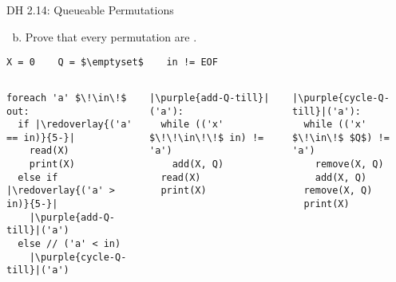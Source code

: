 \begin{frame}[fragile]{}
  \begin{exampleblock}{DH 2.14: Queueable Permutations}
    \begin{enumerate}[(a)]
      \setcounter{enumi}{1}
      \item Prove that every permutation are .
    \end{enumerate}
  \end{exampleblock}

  \pause
  \begin{lstlisting}[style = Cstyle]
              X = 0    Q = $\emptyset$    in != EOF
  \end{lstlisting}

  \begin{columns}
      \begin{lstlisting}[style = Cstyle]
foreach 'a' $\!\in\!$ out:
  if |\redoverlay{('a' == in)}{5-}|
    read(X)
    print(X)
  else if |\redoverlay{('a' > in)}{5-}|
    |\purple{add-Q-till}|('a')
  else // ('a' < in)
    |\purple{cycle-Q-till}|('a')
      \end{lstlisting}
    \pause
      \begin{lstlisting}[style = Cstyle]
|\purple{add-Q-till}|('a'):
  while (('x' $\!\!\in\!\!$ in) != 'a')
    add(X, Q)
  read(X)
  print(X)
      \end{lstlisting}
      \pause
      \begin{lstlisting}[style = Cstyle]
|\purple{cycle-Q-till}|('a'):
  while (('x' $\!\in\!$ $Q$) != 'a')
    remove(X, Q)
    add(X, Q)
  remove(X, Q)
  print(X)
      \end{lstlisting}
  \end{columns}
\end{frame}

